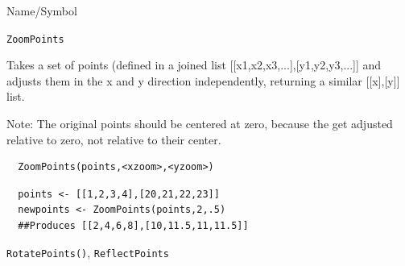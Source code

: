 \begin{desc}{Name/Symbol}
\item[Name/Symbol]	\verb+ZoomPoints+

\item[Description]  Takes a set of points (defined in a joined list 
[[x1,x2,x3,...],[y1,y2,y3,...]] and adjusts them in the x and y
direction independently, returning a similar [[x],[y]] list.

Note: The original points should be centered at zero, because the get
adjusted relative to zero, not relative to their center.

\item[Usage]
\begin{verbatim}
  ZoomPoints(points,<xzoom>,<yzoom>)
\end{verbatim}

\item[Example] 
\begin{verbatim}
  points <- [[1,2,3,4],[20,21,22,23]]
  newpoints <- ZoomPoints(points,2,.5)
  ##Produces [[2,4,6,8],[10,11.5,11,11.5]]
\end{verbatim}

\item[See Also] \verb+RotatePoints()+, \verb+ReflectPoints+
\end{desc} 
